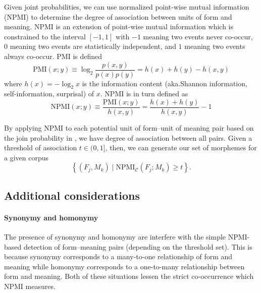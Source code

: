Given joint probabilities, we can use normalized point-wise mutual information (NPMI) \citep{bouma2009npmi,lipinski2024speaking} to determine the degree of association between units of form and meaning.
NPMI is an extension of point-wise mutual information which is constrained to the interval $[-1,1]$
  with $-1$ meaning two events never co-occur, $0$ meaning two events are statistically independent, and $1$ meaning two events always co-occur.
PMI is defined
\begin{equation}
  \text{PMI}(x;y) \equiv \log_2\frac{p(x,y)}{p(x)p(y)}
    = h(x) + h(y) - h(x,y)
\end{equation}
where $h(x)=-\log_2 x$ is the information content (aka.\@ Shannon information, self-information, surprisal) of $x$.
NPMI is in turn defined as
\begin{equation}
  \text{NPMI}(x;y) \equiv \frac{\text{PMI}(x;y)}{h(x,y)}
    = \frac{h(x)+h(y)}{h(x,y)} - 1
\end{equation}

By applying NPMI to each potential unit of form--unit of meaning pair based on the join probability in , we have degree of association between all pairs.
Given a threshold of association $t\in(0,1]$, then, we can generate our set of morphemes for a given corpus
\begin{equation} \label{eq:morph-set}
  \left\{(F_j, M_k) \mid \text{NPMI}_{\mathcal C}(F_j; M_k) \ge t \right\}
  .
\end{equation}


\subsection{Additional considerations}

\paragraph{Synonymy and homonymy}
The presence of synonymy and homonymy are interfere with the simple NPMI-based detection of form--meaning pairs (depending on the threshold set).
This is because synonymy corresponds to a many-to-one relationship of form and meaning while homonymy corresponds to a one-to-many relationship between form and meaning.
Both of these situations lessen the strict co-occurrence which NPMI measures.

